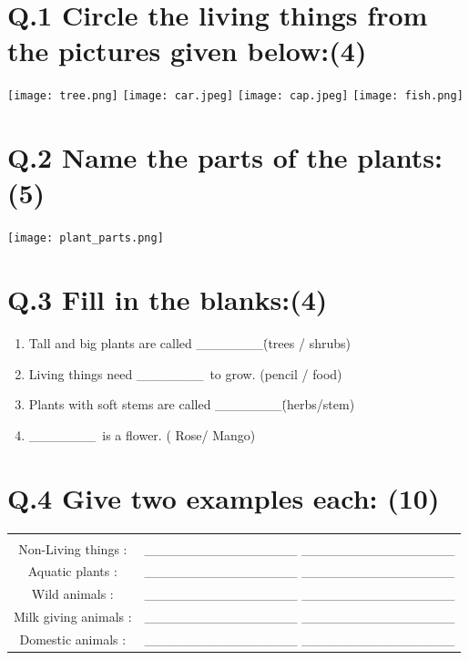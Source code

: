 \documentclass[12pt,a4paper]{article}
\begin{document}
\section*{Q.1 Circle the living things from the pictures given below:(4)}
\begin{enumerate}
\texttt{[image: tree.png]}\hspace{50}
\texttt{[image: car.jpeg]}\hspace{50}
\texttt{[image: cap.jpeg]}\hspace{50}
\texttt{[image: fish.png]}\hspace{50}

\end{enumerate}
\section*{Q.2 Name the parts of the plants: (5)}
\begin{enumerate}
 \texttt{[image: plant\_parts.png]}   
\end{enumerate}
\section*{Q.3 Fill in the blanks:(4) }
\begin{enumerate} 
\item Tall and big plants are called \_\_\_\_\_\_\_\. (trees / shrubs)
\item Living things need \_\_\_\_\_\_\_\ to grow. (pencil / food)
\item Plants with soft stems are called \_\_\_\_\_\_\_\. (herbs/stem)
\item \_\_\_\_\_\_\_\ is a flower. ( Rose/ Mango)
\end{enumerate}
\section*{Q.4 Give two examples each: (10)}
\begin{table}[H]
\begin{flushleft}
\begin{tabular}{cc}
    \multicolumn{1}{c}{}\\
    Non-Living things : & \_\_\_\_\_\_\_\_\_\_\_\_\_\_\_\_ \hspace{10} \_\_\_\_\_\_\_\_\_\_\_\_\_\_\_\_ \\
    Aquatic plants : & \_\_\_\_\_\_\_\_\_\_\_\_\_\_\_\_ \hspace{10} \_\_\_\_\_\_\_\_\_\_\_\_\_\_\_\_ \\
    Wild animals : & \_\_\_\_\_\_\_\_\_\_\_\_\_\_\_\_ \hspace{10} \_\_\_\_\_\_\_\_\_\_\_\_\_\_\_\_ \\
    Milk giving animals : & \_\_\_\_\_\_\_\_\_\_\_\_\_\_\_\_ \hspace{10} \_\_\_\_\_\_\_\_\_\_\_\_\_\_\_\_ \\
    Domestic animals : & \_\_\_\_\_\_\_\_\_\_\_\_\_\_\_\_ \hspace{10} \_\_\_\_\_\_\_\_\_\_\_\_\_\_\_\_ \\
\end{tabular}
\end{flushleft}
\label{tab:multicol}
\end{table}
\end{document}
